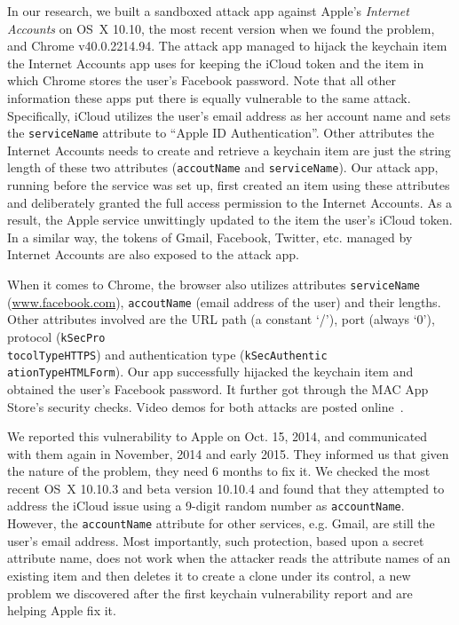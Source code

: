 \documentclass{article}
\newcommand{\ignore}[1]{}
\begin{document}
In our research, we built a sandboxed attack app against Apple's \textit{Internet Accounts} on OS~X 10.10, the most recent version when we found the problem, and Chrome v40.0.2214.94. The attack app managed to hijack the keychain item the Internet Accounts app uses for keeping the iCloud token and the item in which Chrome stores the user's Facebook password. Note that all other information these apps put there is equally vulnerable to the same attack.  Specifically, iCloud utilizes the user's email address as her account name and sets the \texttt{serviceName} attribute to ``Apple ID Authentication''.  Other attributes the Internet Accounts needs to create and retrieve a keychain item are just the string length of these two attributes (\texttt{accoutName} and \texttt{serviceName}). Our attack app, running before the service was set up, first created an item using these attributes and deliberately granted the full access permission to the Internet Accounts.  As a result, the Apple service unwittingly updated to the item the user's iCloud token\ignore{, after it was configured by the user}. In a similar way, the tokens of Gmail, Facebook, Twitter, etc. managed by Internet Accounts are also exposed to the attack app.

When it comes to Chrome,  the browser also utilizes attributes \texttt{serviceName} (\url{www.facebook.com}), \texttt{accoutName} (email address of the user) and their lengths. Other attributes involved are the URL path (a constant `/'), port (always `0'), protocol (\texttt{kSecPro\\tocolTypeHTTPS}) and authentication type (\texttt{kSecAuthentic\\ationTypeHTMLForm}).\ignore{ All these attributes are predictable, allowing the attacker to pre-empt the keychain item.  As a result,} Our app successfully hijacked the keychain item and obtained the user's Facebook password. It further got through the MAC App Store's security checks. Video demos for both attacks are posted online~\cite{supporting}.

We reported this vulnerability to Apple on Oct. 15, 2014, and communicated with them again in November, 2014 and early 2015. They informed us that given the nature of the problem, they need 6 months to fix it. We checked the most recent OS~X 10.10.3 and beta version 10.10.4 and found that they attempted to address the iCloud issue using a 9-digit random number as \texttt{accountName}.\ignore{ The number is obtained by the app from the Apple server to identify an iCloud user.} However, the \texttt{accountName} attribute for other services, e.g. Gmail, are still the user's email address. Most importantly, such protection, based upon a secret attribute name, does not work when the attacker reads the attribute names of an existing item and then deletes it to create a clone under its control, a new problem we discovered after the first keychain vulnerability report and are helping Apple fix it.
\end{document}
